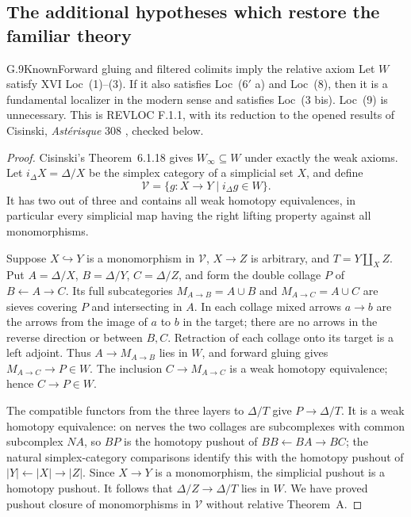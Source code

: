 \subsection{The additional hypotheses which restore the familiar theory}

\begin{claim}{G.9}{Known}{Forward gluing and filtered colimits imply the relative axiom}
\label{G:gluing-recovery}
Let $W$ satisfy XVI Loc~(1)--(3).  If it also satisfies
Loc~($6'$ a) and Loc~(8), then it is a fundamental localizer in the
modern sense and satisfies Loc~(3 bis).  Loc~(9) is unnecessary.
This is REVLOC F.1.1, with its reduction to the opened results of
Cisinski, \emph{Ast\'erisque} 308 \cite{Cisinski2006}, checked below.
\end{claim}
\begin{proof}
Cisinski's Theorem~6.1.18 gives $W_\infty\subseteq W$ under exactly
the weak axioms.  Let $i_\Delta X=\Delta/X$ be the simplex category
of a simplicial set $X$, and define
\[
 \mathcal V=\{g:X\to Y\mid i_\Delta g\in W\}.
\]
It has two out of three and contains all weak homotopy equivalences,
in particular every simplicial map having the right lifting property
against all monomorphisms.

Suppose $X\hookrightarrow Y$ is a monomorphism in $\mathcal V$,
$X\to Z$ is arbitrary, and $T=Y\amalg_X Z$.  Put
$A=\Delta/X$, $B=\Delta/Y$, $C=\Delta/Z$, and form the double
collage $P$ of $B\leftarrow A\to C$.  Its full subcategories
$M_{A\to B}=A\cup B$ and $M_{A\to C}=A\cup C$ are sieves
covering $P$ and intersecting in $A$.  In each collage mixed arrows
$a\to b$ are the arrows from the image of $a$ to $b$ in the target;
there are no arrows in the reverse direction or between $B,C$.
Retraction of each collage onto its target is a left adjoint.
Thus $A\to M_{A\to B}$ lies in $W$, and forward gluing gives
$M_{A\to C}\to P\in W$.  The inclusion $C\to M_{A\to C}$ is
a weak homotopy equivalence; hence $C\to P\in W$.

The compatible functors from the three layers to $\Delta/T$ give
$P\to\Delta/T$.  It is a weak homotopy equivalence: on nerves the
two collages are subcomplexes with common subcomplex $NA$, so $BP$
is the homotopy pushout of $BB\leftarrow BA\to BC$; the natural
simplex-category comparisons identify this with the homotopy pushout
of $|Y|\leftarrow|X|\to|Z|$.  Since $X\to Y$ is a monomorphism,
the simplicial pushout is a homotopy pushout.  It follows that
$\Delta/Z\to\Delta/T$ lies in $W$.  We have proved pushout closure
of monomorphisms in $\mathcal V$ without relative Theorem~A.


\end{proof}
